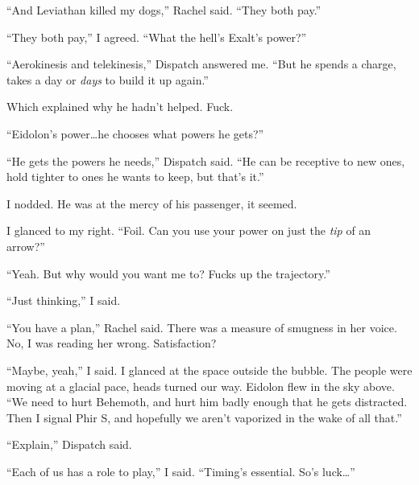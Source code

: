 ``And Leviathan killed my dogs,'' Rachel said.  ``They both pay.''



``They both pay,'' I agreed.  ``What the hell's Exalt's power?''



``Aerokinesis and telekinesis,'' Dispatch answered me.  ``But he spends a charge, takes a day or \emph{days} to build it up again.''



Which explained why he hadn't helped.  Fuck.



``Eidolon's power\ldots he chooses what powers he gets?''



``He gets the powers he needs,'' Dispatch said.  ``He can be receptive to new ones, hold tighter to ones he wants to keep, but that's it.''



I nodded.  He was at the mercy of his passenger, it seemed.



I glanced to my right.  ``Foil.  Can you use your power on just the \emph{tip} of an arrow?''



``Yeah.  But why would you want me to?  Fucks up the trajectory.''



``Just thinking,'' I said.



``You have a plan,'' Rachel said.  There was a measure of smugness in her voice.  No, I was reading her wrong.  Satisfaction?



``Maybe, yeah,'' I said.  I glanced at the space outside the bubble.  The people were moving at a glacial pace, heads turned our way.  Eidolon flew in the sky above.  ``We need to hurt Behemoth, and hurt him badly enough that he gets distracted.  Then I signal Phir S, and hopefully we aren't vaporized in the wake of all that.''



``Explain,'' Dispatch said.



``Each of us has a role to play,'' I said.  ``Timing's essential.  So's luck\ldots''



\sectionbreak



